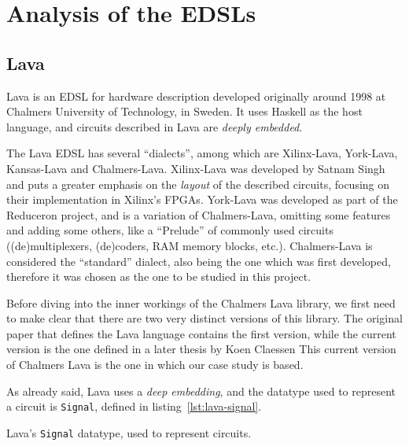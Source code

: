 \section{Analysis of the EDSLs}
\label{sec:edsls}

    \subsection{Lava}
    \label{subsec:lava}

        Lava\cite{lava1998} is an \ac{EDSL} for hardware description developed originally around
        1998 at Chalmers University of Technology, in Sweden. It uses Haskell as the host language,
        and circuits described in Lava are \emph{deeply embedded}.

        The Lava \ac{EDSL} has several ``dialects'', among which are Xilinx-Lava, York-Lava,
        Kansas-Lava and Chalmers-Lava. Xilinx-Lava\cite{xilinx-lava} was developed by Satnam Singh
        and puts a greater emphasis on the \emph{layout} of the described circuits, focusing on
        their implementation in Xilinx's FPGAs. York-Lava was developed as part of the
        Reduceron\cite{reduceron} project, and is a variation of Chalmers-Lava, omitting some
        features and adding some others, like a ``Prelude'' of commonly used circuits
        ((de)multiplexers, (de)coders, RAM memory blocks, etc.). Chalmers-Lava is considered the
        ``standard'' dialect, also being the one which was first developed, therefore it was chosen
        as the one to be studied in this project.

        Before diving into the inner workings of the Chalmers Lava library, we first need to make
        clear that there are two very distinct versions of this library. The original paper that
        defines the Lava language\cite{lava1998} contains the first version, while the current
        version is the one defined in a later thesis\cite{claessen-thesis} by Koen Claessen
        This current version of Chalmers Lava is the one in which our case study is based.

        As already said, Lava uses a \emph{deep embedding}, and the datatype used to represent a
        circuit is \texttt{Signal}, defined in listing~\ref{lst:lava-signal}.

        \begin{listing}[h!]
            \caption{Lava's \texttt{Signal} datatype, used to represent circuits.
                \label{lst:lava-signal}}
        \end{listing}

